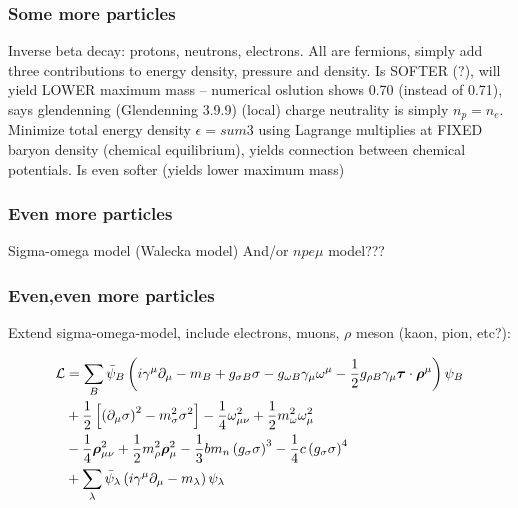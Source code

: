 \subsubsection{Some more particles}

Inverse beta decay: protons, neutrons, electrons.
All are fermions, simply add three contributions to energy density, pressure and density.
Is SOFTER (?), will yield LOWER maximum mass -- numerical oslution shows 0.70 (instead of 0.71), says glendenning (Glendenning 3.9.9)
(local) charge neutrality is simply $n_p = n_e$.
Minimize total energy density $\epsilon = sum3$ using Lagrange multiplies at FIXED baryon density (chemical equilibrium), yields connection between chemical potentials.
Is even softer (yields lower maximum mass)

\subsubsection{Even more particles}

Sigma-omega model (Walecka model)
And/or $npe\mu$ model???

\subsubsection{Even,even more particles}

Extend sigma-omega-model, include electrons, muons, $\rho$ meson (kaon, pion, etc?):


\begin{equation}
\begin{split}
	\mathcal{L} &= \sum_B \bar\psi_B \left( i \gamma^\mu \partial_\mu - m_B + g_{\sigma B} \sigma - g_{\omega B} \gamma_\mu \omega^\mu - \frac12 g_{\rho B} \gamma_\mu {\bm{\tau}} \cdot {\bm{\rho}}^\mu \right) \psi_B \\
	      &+ \frac12 \left[ \left( \partial_\mu \sigma \right)^2 - m_\sigma^2 \sigma^2 \right] - \frac14 \omega_{\mu \nu}^2 + \frac12 m_\omega^2 \omega_\mu^2 \\
	      &- \frac14 {\bm{\rho}}_{\mu\nu}^2 + \frac12 m_\rho^2 {\bm{\rho}}_\mu^2 - \frac13 b m_n \left( g_\sigma \sigma \right)^3 - \frac14 c \left( g_\sigma \sigma \right)^4 \\
	      &+ \sum_\lambda \bar\psi_\lambda \left( i \gamma^\mu \partial_\mu - m_\lambda \right) \psi_\lambda \\
\end{split}
\end{equation}

